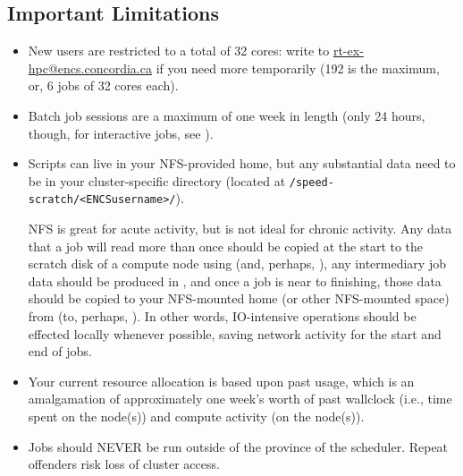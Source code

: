 \documentclass{easychair}
\begin{document}
\subsection{Important Limitations}
\label{sect:limitations}

\begin{itemize}
\item
New users are restricted to a total of 32 cores: write to \url{rt-ex-hpc@encs.concordia.ca}
if you need more temporarily (192 is the maximum, or, 6 jobs of 32 cores each).

\item
Batch job sessions are a maximum of one week in length (only 24 hours, though,
for interactive jobs, see ).

\item
Scripts can live in your NFS-provided home, but any substantial data need
to be in your cluster-specific directory
(located at \verb+/speed-scratch/<ENCSusername>/+).

NFS is great for acute activity, but is not ideal for chronic activity.
Any data that a job will 
read more than once should be copied at the start to the scratch disk of a 
compute node using  (and, perhaps, ), 
any intermediary job data should be produced in , and once a 
job is near to finishing, those data should be copied to your NFS-mounted 
home (or other NFS-mounted space) from  (to, perhaps,
). In other words, IO-intensive operations should be effected 
locally whenever possible, saving network activity for the start and end of 
jobs. 

\item
Your current resource allocation is based upon past usage, which is an 
amalgamation of approximately one week's worth of past wallclock (i.e., time 
spent on the node(s)) and compute activity (on the node(s)).

\item
Jobs should NEVER be run outside of the province of the scheduler.
Repeat offenders risk loss of cluster access. 

\end{itemize}



\end{document}
